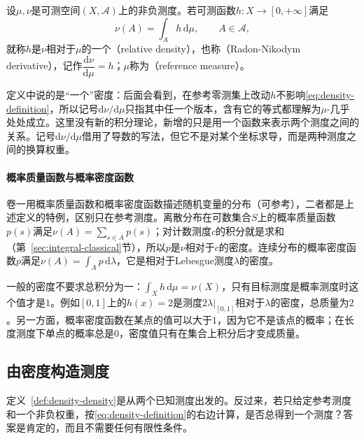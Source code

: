 \begin{definition}[相对密度]
\label{def:density-density}
设$\mu,\nu$是可测空间$(X,\mathcal A)$上的非负测度。若可测函数$h:X\to[0,+\infty]$满足
\begin{equation}
 \nu(A)=\int_Ah\,\mathrm d\mu,\qquad A\in\mathcal A,
 \label{eq:density-definition}
\end{equation}
就称$h$是$\nu$相对于$\mu$的一个（relative density），也称（Radon-Nikodym derivative），记作$\dfrac{\mathrm d\nu}{\mathrm d\mu}=h$；$\mu$称为（reference measure）。
\end{definition}

定义中说的是“一个”密度：后面会看到，在参考零测集上改动$h$不影响\eqref{eq:density-definition}，所以记号$\mathrm d\nu/\mathrm d\mu$只指其中任一个版本，含有它的等式都理解为$\mu$-几乎处处成立。这里没有新的积分理论，新增的只是用一个函数来表示两个测度之间的关系。记号$\mathrm d\nu/\mathrm d\mu$借用了导数的写法，但它不是对某个坐标求导，而是两种测度之间的换算权重。

\paragraph{概率质量函数与概率密度函数}
卷一用概率质量函数和概率密度函数描述随机变量的分布（可参考），二者都是上述定义的特例，区别只在参考测度。离散分布在可数集合$S$上的概率质量函数$p(s)$满足$\nu(A)=\sum_{s\in A}p(s)$；对计数测度$c$的积分就是求和（第~\ref{sec:integral-classical}节），所以$p$是$\nu$相对于$c$的密度。连续分布的概率密度函数$p$满足$\nu(A)=\int_Ap\,\mathrm d\lambda$，它是相对于Lebesgue测度$\lambda$的密度。

一般的密度不要求总积分为一：$\int_Xh\,\mathrm d\mu=\nu(X)$，只有目标测度是概率测度时这个值才是$1$。例如$[0,1]$上的$h(x)=2$是测度$2\lambda|_{[0,1]}$相对于$\lambda$的密度，总质量为$2$。另一方面，概率密度函数在某点的值可以大于$1$，因为它不是该点的概率；在长度测度下单点的概率总是$0$，密度值只有在集合上积分后才变成质量。

\subsection{由密度构造测度}
\label{sec:density-weighted-measure}

定义~\ref{def:density-density}是从两个已知测度出发的。反过来，若只给定参考测度和一个非负权重，按\eqref{eq:density-definition}的右边计算，是否总得到一个测度？答案是肯定的，而且不需要任何有限性条件。

